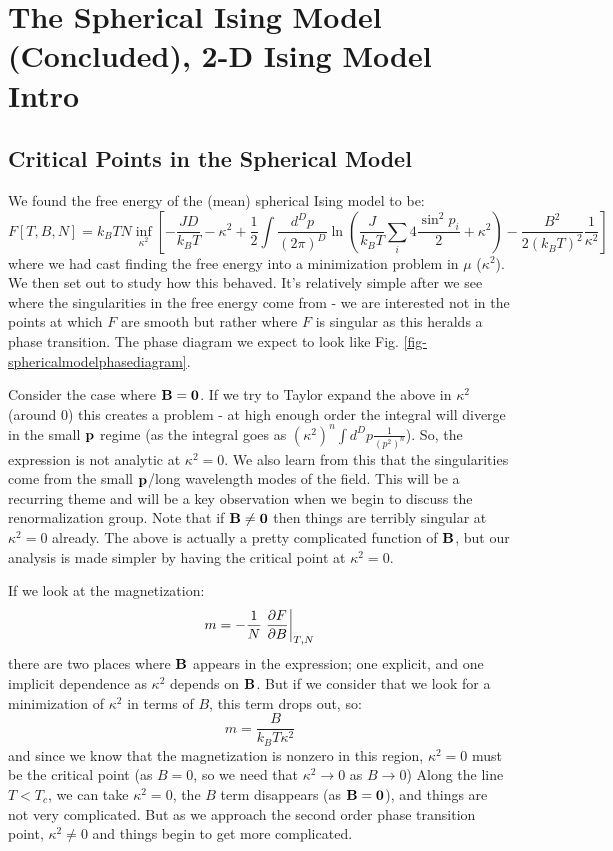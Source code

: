 \section{The Spherical Ising Model (Concluded), 2-D Ising Model Intro}

\subsection{Critical Points in the Spherical Model}
We found the free energy of the (mean) spherical Ising model to be:
\begin{equation}
    F[T, B, N] = k_B T N \inf_{\kappa^2}\left[-\frac{JD}{k_B T} - \kappa^2 + \frac{1}{2}\int \frac{d^Dp}{(2\pi)^D} \ln\left(\frac{J}{k_B T}\sum_i 4\frac{\sin^2 p_i}{2} + \kappa^2\right)- \frac{B^2}{2(k_B T)^2}\frac{1}{\kappa^2}\right]
\end{equation}
where we had cast finding the free energy into a minimization problem in $\mu$ ($\kappa^2$). We then set out to study how this behaved. It's relatively simple after we see where the singularities in the free energy come from - we are interested not in the points at which $F$ are smooth but rather where $F$ is singular as this heralds a phase transition. The phase diagram we expect to look like Fig. \ref{fig-sphericalmodelphasediagram}.

Consider the case where $\mathbf{B} = \mathbf{0}$. If we try to Taylor expand the above in $\kappa^2$ (around 0) this creates a problem - at high enough order the integral will diverge in the small $\mathbf{p}$ regime (as the integral goes as $(\kappa^2)^n \int d^D p \frac{1}{(p^2)^n}$). So, the expression is not analytic at $\kappa^2 = 0$. We also learn from this that the singularities come from the small $\mathbf{p}$/long wavelength modes of the field. This will be a recurring theme and will be a key observation when we begin to discuss the renormalization group. Note that if $\mathbf{B} \neq \mathbf{0}$ then things are terribly singular at $\kappa^2 = 0$ already. The above is actually a pretty complicated function of $\mathbf{B}$, but our analysis is made simpler by having the critical point at $\kappa^2 = 0$. 

If we look at the magnetization:
\begin{equation}
    m = -\frac{1}{N}\left.\frac{\partial F}{\partial B}\right|_{T, N}
\end{equation}
there are two places where $\mathbf{B}$ appears in the expression; one explicit, and one implicit dependence as $\kappa^2$ depends on $\mathbf{B}$. But if we consider that we look for a minimization of $\kappa^2$ in terms of $B$, this term drops out, so:
\begin{equation}
    m = \frac{B}{k_B T \kappa^2}
\end{equation}
and since we know that the magnetization is nonzero in this region, $\kappa^2 = 0$ must be the critical point (as $B = 0$, so we need that $\kappa^2 \to 0$ as $B \to 0$) Along the line $T < T_c$, we can take $\kappa^2 = 0$, the $B$ term disappears (as $\mathbf{B} = \mathbf{0}$), and things are not very complicated. But as we approach the second order phase transition point, $\kappa^2 \neq 0$ and things begin to get more complicated.

